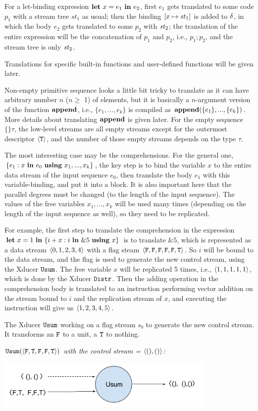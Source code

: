 For a let-binding expression $\mathbf{let} \ x = e_1 \ \mathbf{in} \ e_2$,  first $e_1$ gets translated to some code $p_1$ with a stream tree $st_1$ as usual; then the binding $[x \|-> \st_1]$ is added to $\delta$, in which the body $e_2$ gets translated to some $p_2$ with $\mathit{st}_2$; the translation of the entire expression will be the concatenation of $p_1$ and $p_2$, i.e., $p_1;p_2$, and the stream tree is only $\mathit{st}_2$.

Translations for specific built-in functions and user-defined functions will be given later.


Non-empty primitive sequence looks a little bit tricky to translate as it can have arbitrary  number $n$ ($ n \ge$ 1) of elements, but it is basically a $n$-argument version of the function $\mathbf{append}$,
i.e.,  $\{e_1,...,e_k\}$ is compiled as $\mathbf{append}(\{e_1\},...,\{e_k\})$. 
More details about translating $\mathbf{append}$ is given later. 
For the empty sequence $\{\}\tau$, the low-level streams are all empty streams except for the outermost descriptor $\langle \mathtt{T} \rangle$, and the number of those empty streams depends on the type $\tau$.

The most interesting case may be the comprehensions. 
For the general one, $\{e_1 : x \ \mathbf{in} \ e_0 \ \mathbf{using} \ x_1,...,x_k\}$, the key step is to bind the variable $x$ to the entire data stream of the input sequence $e_0$, then translate the body $e_1$ with this variable-binding, and put it into a \wc block. 
It is also important here that the parallel degrees must be changed (to the length of the input sequence).
The values of the free variables  $x_1,...,x_k$ will be used many times (depending on the length of the input sequence as well), so they need to be replicated.

For example, the first step to translate the comprehension in the expression $\mathbf{let} \ x = 1 \ \mathbf{in} \ \{i+x : i \ \mathbf{in} \ \&5 \ \mathbf{using} \ x\}$ is to translate $\&5$, which is represented as a data stream $\<0,1,2,3,4\'>$ with a flag steam $\<\F,\F,\F,\F,\F,\T\'>$.
So $i$ will be bound to the data stream, and the flag is used to generate the new control stream, using the Xducer $\mathtt{Usum}$.
The free variable $x$ will be replicated 5 times, i.e., $\<1,1,1,1,1\'>$, which is done by the Xducer $\mathtt{Distr}$.
Then the adding operation in the comprehension body is translated to an instruction performing vector addition on the stream bound to $i$ and the replication stream of $x$, and executing the instruction will give us $\<1,2,3,4,5\'>$. 


The Xducer $\mathtt{Usum}$ working on a flag stream $s_b$ to generate the new control stream. It transforms an $\mathtt{F}$ to a unit, a $\mathtt{T}$ to nothing.
\begin{example} \emph{$\usumf{\<\F,\T,\F,\F,\T\'>}$ with the control stream = $\<(),() \'>$:} \\
	\begin{center}
		\includegraphics[width=0.8\textwidth]{fig/usumxducer.png}
	\end{center}
\end{example}

